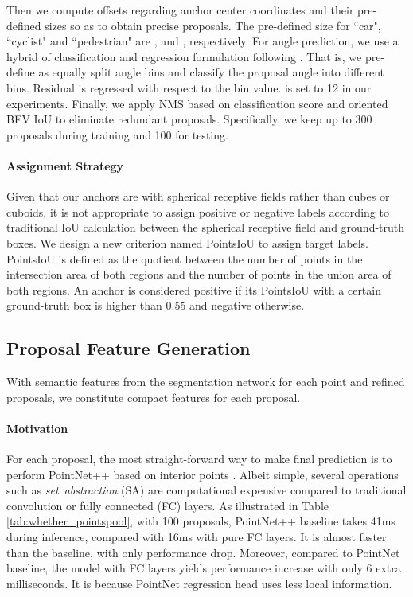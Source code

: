 \documentclass[10pt,twocolumn,letterpaper]{article}
\begin{document}
Then we compute offsets regarding anchor center coordinates  and their pre-defined sizes  so as to obtain precise proposals. 
The pre-defined size for ``car", ``cyclist" and ``pedestrian" are ,  and , respectively. 
For angle prediction, we use a hybrid of classification and regression formulation following \cite{FPOINTNET}. That is, we pre-define  as equally split angle bins and classify the proposal angle into different bins. Residual is regressed with respect to the bin value.  is set to 12 in our experiments. Finally, we apply NMS based on classification score and oriented BEV IoU to eliminate redundant proposals. Specifically, we keep up to 300 proposals during training and 100 for testing. 


\vspace{-0.1in}
\paragraph{Assignment Strategy}
Given that our anchors are with spherical receptive fields rather than cubes or cuboids, it is not appropriate to assign positive or negative labels according to traditional IoU calculation \cite{VOXELNET} between the spherical receptive field and ground-truth boxes. We design a new criterion named PointsIoU to assign target labels. PointsIoU is defined as the quotient between the number of points in the intersection area of both regions and the number of points in the union area of both regions.
An anchor is considered positive if its PointsIoU with a certain ground-truth box is higher than 0.55 and negative otherwise. 


\subsection{Proposal Feature Generation}
With semantic features from the segmentation network for each point and refined proposals, we constitute compact features for each proposal. 

\vspace{-0.1in}
\paragraph{Motivation}
For each proposal, the most straight-forward way to make final prediction is to perform PointNet++ based on interior points \cite{shi2018pointrcnn,FPOINTNET}. Albeit simple, several operations such as {\it set\ abstraction} (SA) are computational expensive compared to traditional convolution or fully connected (FC) layers. As illustrated in Table \ref{tab:whether_pointspool}, with 100 proposals, PointNet++ baseline takes 41ms during inference, compared with 16ms with pure FC layers. It is almost  faster than the baseline, with only  performance drop. Moreover, compared to PointNet baseline, the model with FC layers yields  performance increase with only 6 extra milliseconds. It is because PointNet regression head uses less local information. 
\end{document}
